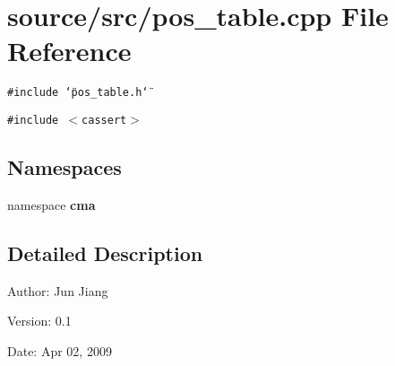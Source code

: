 \section{source/src/pos\_\-table.cpp File Reference}
\label{pos__table_8cpp}
{\tt \#include \char`\"{}pos\_\-table.h\char`\"{}}\par
{\tt \#include $<$cassert$>$}\par
\subsection*{Namespaces}
\begin{CompactItemize}
\item 
namespace \textbf{cma}
\end{CompactItemize}


\subsection{Detailed Description}
\begin{Desc}
\item[Author:]Jun Jiang \end{Desc}
\begin{Desc}
\item[Version:]0.1 \end{Desc}
\begin{Desc}
\item[Date:]Apr 02, 2009 \end{Desc}
